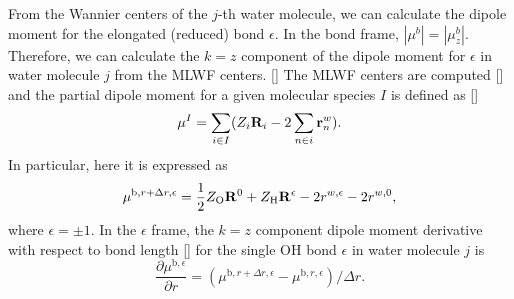     From the Wannier centers of the $j$-th water molecule, we can calculate the dipole moment for the elongated (reduced) 
    bond ${\epsilon}$. 
    In the bond frame, $|\mu^b| =|\mu^b_z|$. 
    Therefore, we can calculate the $k=z$ component of the dipole moment for ${\epsilon}$ in water molecule $j$ from the MLWF centers. [\cite{Silvestrelli1999}] 
      The MLWF centers are computed [\cite{Silvestrelli1999}] and the partial dipole moment for a given molecular species $I$ is defined as [\cite{Salanne08}]
      \begin{equation}
        \mu^I = \sum_{i\in I}(Z_i {\bf R}_i - 2\sum_{n\in i} {\bf r}^w_n).
      \end{equation}
In particular, here it is expressed as 
\begin{equation}
  \mu^{\text{b},r+\Delta r,\epsilon} = \frac{1}{2}Z_{\text{O}} {\bf R}^{0} +Z_{\text{H}}{\bf R}^{\epsilon} -2r^{w,\epsilon} -2r^{w,0},
\end{equation}
where $\epsilon=\pm 1$.
In the $\epsilon$ frame, the $k=z$ component dipole moment derivative with respect to bond length [\cite{Wilson1955}] for the single OH bond $\epsilon$ in water molecule $j$ is
        \begin{equation}
          \frac{\partial \mu^{\text{b},\epsilon}}{\partial r} = (\mu^{\text{b},r+\Delta r,\epsilon}-\mu^{\text{b},r,\epsilon})/\Delta r.
        \end{equation}
